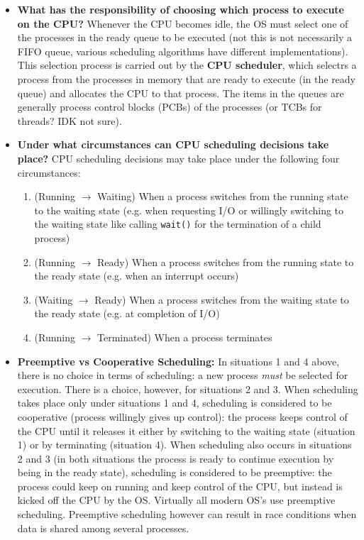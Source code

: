 \documentclass[12pt]{article}
\begin{document}
\begin{itemize}
    \item \textbf{What has the responsibility of choosing which process to execute on the CPU?} Whenever the CPU becomes idle, the OS must select one of the processes in the ready queue to be executed (not this is not necessarily a FIFO queue, various scheduling algorithms have different implementations). This selection process is carried out by the \textbf{CPU scheduler}, which selectrs a process from the processes in memory that are ready to execute (in the ready queue) and allocates the CPU to that process. The items in the queues are generally process control blocks (PCBs) of the processes (or TCBs for threads? IDK not sure).
    \item \textbf{Under what circumstances can CPU scheduling decisions take place?} CPU scheduling decisions may take place under the following four circumstances:
        \begin{enumerate}
            \item (Running \(\rightarrow\) Waiting) When a process switches from the running state to the waiting state (e.g. when requesting I/O or willingly switching to the waiting state like calling \texttt{wait()} for the termination of a child process)
            \item (Running \(\rightarrow\) Ready) When a process switches from the running state to the ready state (e.g. when an interrupt occurs)
            \item (Waiting \(\rightarrow\) Ready) When a process switches from the waiting state to the ready state (e.g. at completion of I/O)
            \item (Running \(\rightarrow\) Terminated) When a process terminates
        \end{enumerate}
    \item \textbf{Preemptive vs Cooperative Scheduling:} In situations 1 and 4 above, there is no choice in terms of scheduling: a new process \textit{must} be selected for execution. There is a choice, however, for situations 2 and 3. When scheduling takes place only under situations 1 and 4, scheduling is considered to be cooperative (process willingly gives up control): the process keeps control of the CPU until it releases it either by switching to the waiting state (situation 1) or by terminating (situation 4). When scheduling also occurs in situations 2 and 3 (in both situations the process is ready to continue execution by being in the ready state), scheduling is considered to be preemptive: the process could keep on running and keep control of the CPU, but instead is kicked off the CPU by the OS. Virtually all modern OS's use preemptive scheduling. Preemptive scheduling however can result in race conditions when data is shared among several processes.

\end{itemize}
\end{document}
